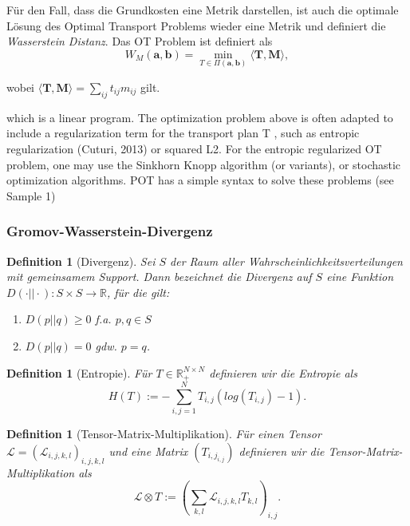 \documentclass[twoside, 12pt,a4paper]{article}
\newtheorem{definition}[theorem]{Definition}
\numberwithin{equation}{section}
\begin{document}
	Für den Fall, dass die Grundkosten eine Metrik darstellen, ist auch die optimale Lösung des Optimal Transport Problems wieder eine Metrik \cite{cuturi2014ground} und definiert die \textit{Wasserstein Distanz}. Das OT Problem ist definiert als
	\begin{equation}
		W_M(\boldsymbol{a},\boldsymbol{b}) = \min_{T \in \Pi(\boldsymbol{a}, \boldsymbol{b})}{\langle \boldsymbol{T}, \boldsymbol{M} \rangle},
	\end{equation}
	
	wobei ${\langle \boldsymbol{T}, \boldsymbol{M} \rangle} = \sum_{ij}{t_{ij}m_{ij}}$ gilt.
	
	which is a linear program. The optimization problem above is often adapted to include a
	regularization term for the transport plan T , such as entropic regularization (Cuturi, 2013)
	or squared L2. For the entropic regularized OT problem, one may use the Sinkhorn Knopp
	algorithm (or variants), or stochastic optimization algorithms. POT has a simple syntax to
	solve these problems (see Sample 1)
	\subsubsection{Gromov-Wasserstein-Divergenz}
	
	\begin{definition}[Divergenz]
		Sei $S$ der Raum aller Wahrscheinlichkeitsverteilungen mit gemeinsamem Support. Dann bezeichnet die Divergenz auf $S$ eine Funktion $D(\cdot || \cdot):S \times S \to \mathbb{R}$, für die gilt:
		\begin{enumerate}
			\item $D(p || q) \geq 0$ f.a. $p,q \in S$\\
			\item $D(p || q) = 0$ gdw. $p = q$.
		\end{enumerate}
		\end{definition}
	\begin{definition}[Entropie]
		Für $T \in \mathbb{R}_{+}^{N \times N}$ definieren wir die Entropie als
		\begin{equation}
			H(T) := - \sum_{i,j=1}^N{T_{i,j}(log(T_{i,j})-1)}.
		\end{equation}
	\end{definition}
	\begin{definition}[Tensor-Matrix-Multiplikation]
		Für einen Tensor $\mathcal{L} = (\mathcal{L}_{i,j,k,l})_{i,j,k,l}$ und eine Matrix $(T_{{i,j}_{i,j}})$ definieren wir die Tensor-Matrix-Multiplikation als
		\begin{equation}
		\mathcal{L} \otimes T := (\sum_{k,l}{\mathcal{L}_{i,j,k,l}T_{k,l}})_{i,j}.
		\end{equation}
	\end{definition}
\end{document}
